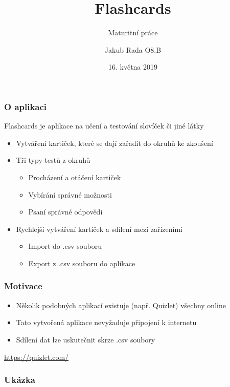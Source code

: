 \documentclass[11pt, xcolor=table]{beamer}
\title{Flashcards}
\subtitle{Maturitní práce}
\author{Jakub Rada O8.B}
\institute{Gymnázium Nad Alejí}
\date{16. května 2019}
\begin{document}
    \frame{\titlepage}
    \begin{frame}
        \frametitle{O aplikaci}
        Flashcards je aplikace na učení a testování slovíček či jiné látky
        \begin{itemize}
            \item Vytváření kartiček, které se dají zařadit do okruhů ke zkoušení
            \item Tři typy testů z okruhů
            \begin{itemize}
                \item Procházení a otáčení kartiček
                \item Vybírání správné možnosti
                \item Psaní správné odpovědi
            \end{itemize}
            \item Rychlejší vytváření kartiček a sdílení mezi zařízeními
            \begin{itemize}
                \item Import do .csv souboru
                \item Export z .csv souboru do aplikace
            \end{itemize}
        \end{itemize}
    \end{frame}
    \begin{frame}
        \frametitle{Motivace}
        \begin{itemize}
            \item Několik podobných aplikací existuje (např. Quizlet)  všechny online
            \item Tato vytvořená aplikace nevyžaduje připojení k internetu
            \item Sdílení dat lze uskutečnit skrze .csv soubory
        \end{itemize}
        \vfill
        \begin{center}
            \url{https://quizlet.com/}
        \end{center}
    \end{frame}
    \begin{frame}
        \frametitle{Ukázka}
    \end{frame}
\end{document}
